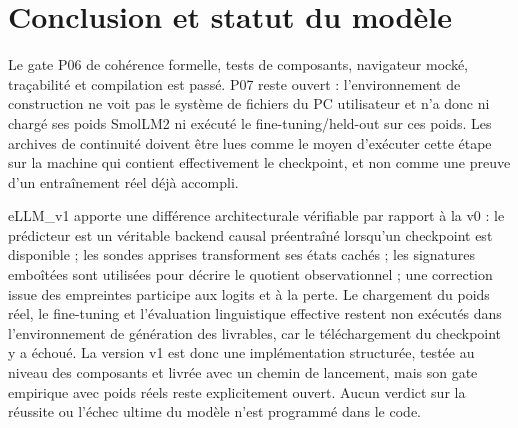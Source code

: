 \documentclass[11pt,a4paper]{article}
\begin{document}
\section{Conclusion et statut du modèle}
Le gate P06 de cohérence formelle, tests de composants, navigateur mocké, traçabilité et compilation est passé. P07 reste ouvert : l’environnement de construction ne voit pas le système de fichiers du PC utilisateur et n’a donc ni chargé ses poids SmolLM2 ni exécuté le fine-tuning/held-out sur ces poids. Les archives de continuité doivent être lues comme le moyen d’exécuter cette étape sur la machine qui contient effectivement le checkpoint, et non comme une preuve d’un entraînement réel déjà accompli.

eLLM\_v1 apporte une différence architecturale vérifiable par rapport à la v0 : le prédicteur est un véritable backend causal préentraîné lorsqu'un checkpoint est disponible ; les sondes apprises transforment ses états cachés ; les signatures emboîtées sont utilisées pour décrire le quotient observationnel ; une correction issue des empreintes participe aux logits et à la perte. Le chargement du poids réel, le fine-tuning et l'évaluation linguistique effective restent non exécutés dans l'environnement de génération des livrables, car le téléchargement du checkpoint y a échoué. La version v1 est donc une implémentation structurée, testée au niveau des composants et livrée avec un chemin de lancement, mais son gate empirique avec poids réels reste explicitement ouvert. Aucun verdict sur la réussite ou l'échec ultime du modèle n'est programmé dans le code.
\end{document}
